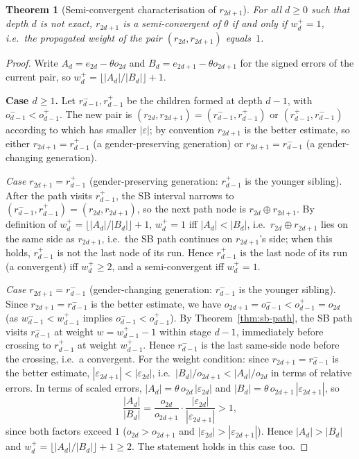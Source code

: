 \documentclass[12pt]{article}
\newtheorem{theorem}{Theorem}[section]
\theoremstyle{definition}
\theoremstyle{remark}
\theoremstyle{plain}
\begin{document}
\begin{theorem}[Semi-convergent characterisation of $r_{2d+1}$]
\label{thm:semi-r1}
  For all $d \geq 0$ such that depth $d$ is not exact, $r_{2d+1}$ is a
  semi-convergent of $\theta$ if and only if $w^+_d = 1$, i.e.\ the propagated
  weight of the pair $(r_{2d}, r_{2d+1})$ equals~$1$.
\end{theorem}

\begin{proof}
Write $A_d = e_{2d} - \theta o_{2d}$ and $B_d = e_{2d+1} - \theta o_{2d+1}$ for the
signed errors of the current pair, so $w^+_d = \lfloor|A_d|/|B_d|\rfloor + 1$.

\medskip
\textbf{Case $d \ge 1$.}
Let $r^-_{d-1}, r^+_{d-1}$ be the children formed at depth $d-1$, with $o^-_{d-1} < o^+_{d-1}$.
The new pair is $(r_{2d}, r_{2d+1}) = (r^-_{d-1}, r^+_{d-1})$ or $(r^+_{d-1}, r^-_{d-1})$ according to which
has smaller $|\varepsilon|$; by convention $r_{2d+1}$ is the better estimate, so
either $r_{2d+1} = r^+_{d-1}$ (a gender-preserving generation) or $r_{2d+1} = r^-_{d-1}$
(a gender-changing generation).

\textit{Case $r_{2d+1} = r^+_{d-1}$} (gender-preserving generation: $r^+_{d-1}$ is the younger sibling).
After the path visits $r^+_{d-1}$, the SB interval narrows to $(r^-_{d-1}, r^+_{d-1}) = (r_{2d}, r_{2d+1})$,
so the next path node is $r_{2d} \oplus r_{2d+1}$.
By definition of $w^+_d = \lfloor|A_d|/|B_d|\rfloor + 1$,
$w^+_d = 1$ iff $|A_d| < |B_d|$, i.e.\ $r_{2d} \oplus r_{2d+1}$ lies on the same side as $r_{2d+1}$,
i.e.\ the SB path continues on $r_{2d+1}$'s side; when this holds, $r^+_{d-1}$ is not the last node of its run.
Hence $r^+_{d-1}$ is the last node of its run (a convergent) iff $w^+_d \ge 2$, and a
semi-convergent iff $w^+_d = 1$.

\textit{Case $r_{2d+1} = r^-_{d-1}$} (gender-changing generation: $r^-_{d-1}$ is the younger sibling).
Since $r_{2d+1} = r^-_{d-1}$ is the better estimate, we have $o_{2d+1} = o^-_{d-1} < o^+_{d-1} = o_{2d}$
(as $w^-_{d-1} < w^+_{d-1}$ implies $o^-_{d-1} < o^+_{d-1}$).
By Theorem~\ref{thm:sb-path}, the SB path visits $r^-_{d-1}$ at weight $w = w^+_{d-1} - 1$
within stage $d-1$, immediately before crossing to $r^+_{d-1}$ at weight $w^+_{d-1}$.
Hence $r^-_{d-1}$ is the last same-side node before the crossing, i.e.\ a convergent.
For the weight condition: since $r_{2d+1} = r^-_{d-1}$ is the better estimate,
$|\varepsilon_{2d+1}| < |\varepsilon_{2d}|$, i.e.\ $|B_d|/o_{2d+1} < |A_d|/o_{2d}$ in terms
of relative errors.
In terms of scaled errors, $|A_d| = \theta\,o_{2d}\,|\varepsilon_{2d}|$ and
$|B_d| = \theta\,o_{2d+1}\,|\varepsilon_{2d+1}|$, so
\[
  \frac{|A_d|}{|B_d|} = \frac{o_{2d}}{o_{2d+1}} \cdot \frac{|\varepsilon_{2d}|}{|\varepsilon_{2d+1}|} > 1,
\]
since both factors exceed $1$ ($o_{2d} > o_{2d+1}$ and $|\varepsilon_{2d}| > |\varepsilon_{2d+1}|$).
Hence $|A_d| > |B_d|$ and $w^+_d = \lfloor|A_d|/|B_d|\rfloor + 1 \ge 2$.
The statement holds in this case too.


\end{proof}
\end{document}
